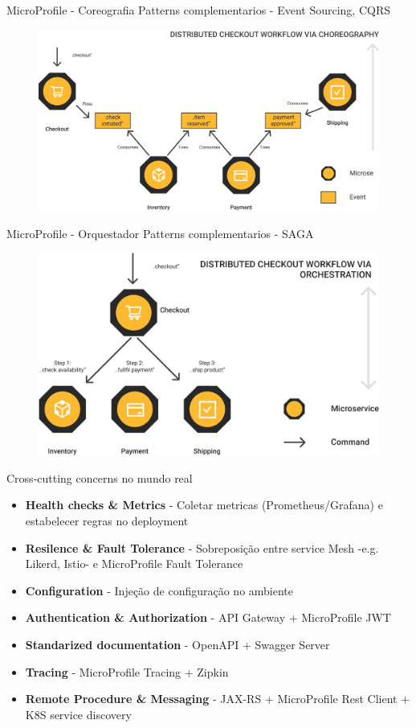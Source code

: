 \documentclass[aspectratio=169]{beamer}
\begin{document}
\begin{frame}{MicroProfile - Coreografia}
Patterns complementarios - Event Sourcing, CQRS
\begin{figure}
	\centering
	\includegraphics[width=0.7\linewidth]{Images/mpcore}
\end{figure}
\end{frame}

\begin{frame}{MicroProfile - Orquestador}
Patterns complementarios - SAGA
\begin{figure}
	\centering
	\includegraphics[width=0.7\linewidth]{Images/mporch}
\end{figure}

\end{frame}

\begin{frame}{Cross-cutting concerns no mundo real}

\begin{itemize}
	\item \textbf{Health checks \& Metrics} - Coletar metricas (Prometheus/Grafana) e estabelecer regras no deployment
	\item \textbf{Resilence \& Fault Tolerance} - Sobreposição entre service Mesh -e.g. Likerd, Istio- e MicroProfile Fault Tolerance
	\item \textbf{Configuration} - Injeção de configuração no ambiente
	\item \textbf{Authentication \& Authorization} - API Gateway + MicroProfile JWT
	\item \textbf{Standarized documentation} - OpenAPI + Swagger Server
    \item \textbf{Tracing} - MicroProfile Tracing + Zipkin
    \item\textbf{ Remote Procedure \& Messaging} - JAX-RS + MicroProfile Rest Client + K8S service discovery
\end{itemize}

\end{frame}
\end{document}
